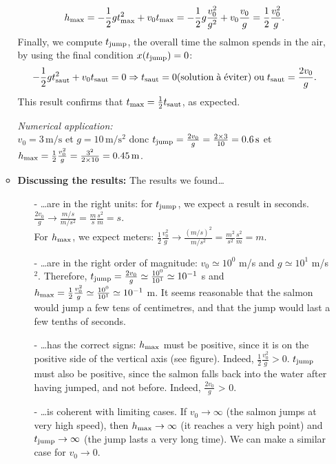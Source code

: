 \begin{enumerate}
\begin{itemize}
\[
h_{\rm max} = -\frac{1}{2}gt_{\rm max}^2 +v_0 t_{\rm max} = -\frac{1}{2}g\frac{v^2_0}{g^2} +v_0 \frac{v_0}{g} = \frac{1}{2}\frac{v_0^2}{g}.
\]
Finally, we compute $t_{\rm jump}$, the overall time the salmon spends in the air, by using the final condition $x(t_{\rm jump}) = 0$:
\[
-\frac{1}{2}gt_{\rm saut}^2 + v_0t_{\rm saut}=0 \Rightarrow t_{\rm saut}=0 \mathrm{(solution\; \grave{a}\;\acute{e}viter)\;ou}\;t_{\rm saut} = \frac{2v_0}{g}.
\]
This result confirms that $t_{\rm max} = \frac{1}{2}t_{\rm saut}$, as expected.

\emph{Numerical application:} \\$v_0=3\,\mathrm{m/s}$ et $g=10 \,\mathrm{m/s^{2}}$ donc $t_{\rm jump} = \frac{2v_0}{g} = \frac{2\times 3}{10}=0.6\,{\rm s}$ et $h_{\rm max} = \frac{1}{2}\frac{v_0^2}{g} = \frac{3^2}{2\times10}=0.45\,{\rm m}$. \\

\item \textbf{Discussing the results:} The results we found\ldots\\
\begin{itemize}
\item[-] \ldots are in the right units: for $t_{\rm jump}$, we expect a result in seconds. $\frac{2v_0}{g} \rightarrow \frac{m/s}{m/s^2} = \frac{m}{s}\frac{s^2}{m} = s$. \\
For $h_{\rm max}$, we expect meters: $\frac{1}{2}\frac{v_0^2}{g} \rightarrow \frac{(m/s)^2}{m/s^2} = \frac{m^2}{s^2}\frac{s^2}{m} = m$. \\
\item[-] \ldots are in the right order of magnitude: $v_0 \simeq 10^0$ m/s and $g \simeq 10^1$ m/s$^2$. Therefore, $t_{\rm jump} = \frac{2v_0}{g} \simeq \frac{10^0}{10^1} \simeq 10^{-1}$ s and $h_{\rm max} = \frac{1}{2}\frac{v_0^2}{g} \simeq \frac{10^0}{10^1} \simeq 10^{-1}$ m. It seems reasonable that the salmon would jump a few tens of centimetres, and that the jump would last a few tenths of seconds. \\
\item[-] \ldots has the correct signs: $h_{\rm max}$ must be positive, since it is on the positive side of the vertical axis (see figure). Indeed, $\frac{1}{2}\frac{v_0^2}{g} > 0$. $t_{\rm jump}$ must also be positive, since the salmon falls back into the water after having jumped, and not before. Indeed, $\frac{2v_0}{g}$ > 0. \\
\item[-] \ldots is coherent with limiting cases. If $v_0 \to \infty$ (the salmon jumps at very high speed), then  $h_{\rm max} \to \infty$ (it reaches a very high point) and  $t_{\rm jump}\to \infty$ (the jump lasts a very long time). We can make a similar case for $v_0 \to 0$. \\
\end{itemize}
\end{itemize}

\end{enumerate}
